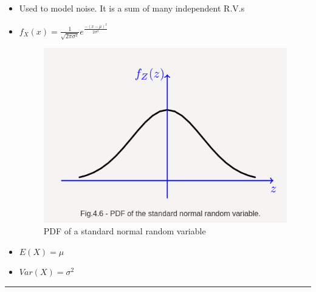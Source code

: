 \begin{itemize}
\item
  Used to model noise. It is a sum of many independent R.V.s
\item
  \(f_X(x) = \frac{1}{\sqrt{2\pi \sigma ^2}}e^\frac{-(x-\mu)^2}{2\sigma ^2}\)

  \begin{figure}[''h!'']
  \centering
  \includegraphics{Lecture 13 Notes e842fef9a3e0449fa78bac59b75dbc5c/Screenshot_from_2021-08-06_23-11-46.png}
  \caption{PDF of a standard normal random variable}
  \end{figure}
\item
  \(E(X) = \mu\)
\item
  \(Var(X) = \sigma ^2\)
\end{itemize}

\begin{center}\rule{0.5\linewidth}{0.5pt}\end{center}
